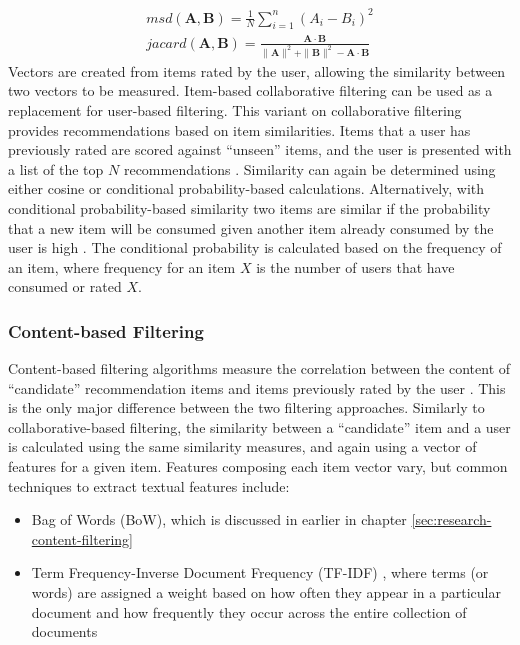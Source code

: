 \begin{align}
msd(\mathbf{A}, \mathbf{B}) = \frac{1}{N}\sum\limits_{i=1}^{n}(A_i - B_i)^2 \label{eq:msd} \\
jacard(\mathbf{A}, \mathbf{B}) = \frac{\mathbf{A} \cdot \mathbf{B}}{\|\mathbf{A}\|^2 + \|\mathbf{B}\|^2 -  \mathbf{A} \cdot \mathbf{B}} \label{eq:jacard}
\end{align}
Vectors are created from items rated by the user, allowing the similarity between two vectors to be measured. Item-based collaborative filtering can be used as a replacement for user-based filtering. This variant on collaborative filtering provides recommendations based on item similarities. Items that a user has previously rated are scored against ``unseen'' items, and the user is presented with a list of the top $N$ recommendations \cite{sarwar2001item}. Similarity can  again be determined using either cosine or conditional probability-based calculations. Alternatively, with conditional probability-based similarity two items are similar if the probability that a new item will be consumed given another item already consumed by the user is high \cite{sarwar2001item}. The conditional probability is calculated based on the frequency of an item, where frequency for an item $X$ is the number of users that have consumed or rated $X$. 

\subsubsection{Content-based Filtering} 
Content-based filtering algorithms measure the correlation between the content of ``candidate'' recommendation items and items previously rated by the user \cite{van2000using}. This is the only major difference between the two filtering approaches. Similarly to collaborative-based filtering, the similarity between a ``candidate'' item and a user is calculated using the same similarity measures, and again using a vector of features for a given item. Features composing each item vector vary, but common techniques to extract textual features include:
\begin{itemize}
\item Bag of Words (BoW), which is discussed in earlier in chapter \ref{sec:research-content-filtering}
\item Term Frequency-Inverse Document Frequency (TF-IDF) \cite{van2000using}, where terms (or words) are assigned a weight based on how often they appear in a particular document and how frequently they occur across the entire collection of documents \cite{scikit:tfidf}
\end{itemize} 

